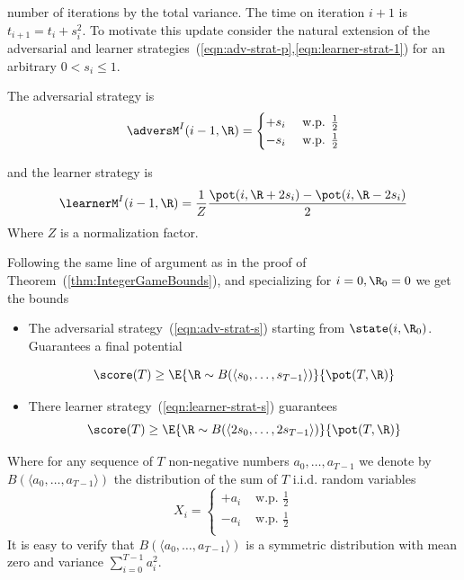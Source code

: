 
number of iterations by the
total variance. 
The time on iteration $i+1$ is $t_{i+1}=t_i+s_i^2$. To motivate this
update consider the natural extension of the adversarial and learner
strategies~(\ref{eqn:adv-strat-p},\ref{eqn:learner-strat-1})
for an arbitrary $0<s_i\leq 1$.

The adversarial strategy is 
\begin{equation} \label{eqn:adv-strat-s}
  \adversM^I(i-1,\R) =
  \begin{cases}
    +s_i & \mbox{ w.p. } \frac{1}{2}\\
    -s_i & \mbox{ w.p. } \frac{1}{2}\\
  \end{cases}
\end{equation}

and the learner strategy is
\begin{equation} \label{eqn:learner-strat-s}
\learnerM^I(i-1,\R) = \frac{1}{Z} \frac{\pot(i,\R+2s_i) - \pot(i,\R-2s_i)}{2}
\end{equation}
Where $Z$ is a normalization factor.



Following the same line of argument as in the proof of
Theorem~(\ref{thm:IntegerGameBounds}), and specializing for
$i=0,\R_0=0$ we get the bounds

  \begin{itemize}
  \item
    The adversarial strategy~(\ref{eqn:adv-strat-s}) starting from
    $\state(i,\R_0)$. Guarantees a final potential 
     
    $$\score(T) \geq \E{\R \sim B(\langle s_0,\ldots,s_{T-1}\rangle)}{\pot(T,\R)}$$
  \item
    There learner strategy~(\ref{eqn:learner-strat-s}) guarantees
    $$\score(T) \geq \E{\R \sim B(\langle 2s_0,\ldots,2s_{T-1}\rangle)}{\pot(T,\R)}$$
  \end{itemize}

Where for any sequence of $T$ non-negative numbers
$a_0,\ldots,a_{T-1}$
we denote by $B(\langle a_0,\ldots,a_{T-1}\rangle)$ the distribution of
the sum of $T$ i.i.d. random variables
$$X_i =   \begin{cases}
    +a_i & \mbox{ w.p. } \frac{1}{2}\\
    -a_i & \mbox{ w.p. } \frac{1}{2}\\
  \end{cases}
$$
It is easy to verify that  $B(\langle a_0,\ldots,a_{T-1}\rangle)$ is a
symmetric distribution with mean zero and variance $\sum_{i=0}^{T-1}
a_i^2$. 

